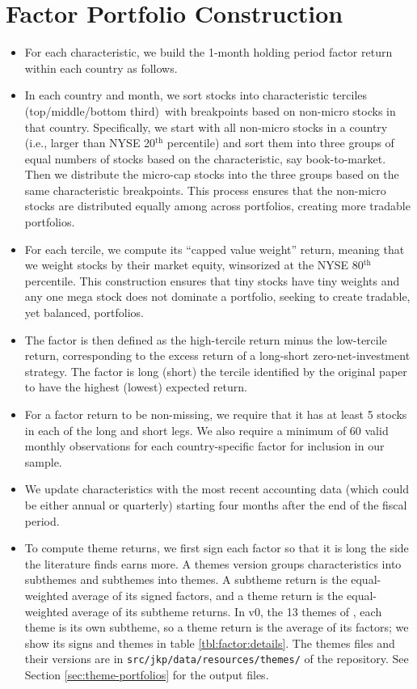 \documentclass[12pt,title,fleqn]{article}
\begin{document}
\section{Factor Portfolio Construction}
\begin{itemize}
	\item For each characteristic, we build the 1-month holding period factor return within each country as follows.  
	\item In each country and month, we sort stocks  into characteristic terciles (top/middle/bottom third)\ with breakpoints based on non-micro stocks in that country.  Specifically, we start with all non-micro stocks in a country (i.e., larger than NYSE  20$^\text{th}$ percentile) and sort them into three groups of equal numbers of stocks based on the characteristic, say book-to-market. Then we distribute the micro-cap stocks into the three groups based on the same characteristic breakpoints. This process ensures that the non-micro stocks are distributed equally among across portfolios, creating more tradable portfolios.  
	\item For each tercile, we compute its ``capped value weight'' return, meaning that we weight stocks by their market equity, winsorized at the NYSE 80$^\text{th}$ percentile. This construction ensures that tiny stocks have tiny weights and any one mega stock does not dominate a portfolio, seeking to create tradable, yet balanced, portfolios.  
	\item The factor is then defined as the high-tercile return minus the low-tercile  return, corresponding to the excess return of a long-short zero-net-investment strategy.  The factor is long (short) the tercile identified by the original paper to have the highest (lowest) expected return.  
	\item For a factor return to be non-missing, we require that it has at least 5 stocks in each of the long and short legs. We also require a minimum of 60 valid monthly observations for each country-specific factor for inclusion in our sample.  
	\item We update characteristics with the most recent accounting data (which could be either annual or quarterly) starting four months after the end of the fiscal period.
	\item To compute theme returns, we first sign each factor so that it is long the side the literature finds earns more. A themes version groups characteristics into subthemes and subthemes into themes. A subtheme return is the equal-weighted average of its signed factors, and a theme return is the equal-weighted average of its subtheme returns. In v0, the 13 themes of \cite{JensenKellyPedersen2023}, each theme is its own subtheme, so a theme return is the average of its factors; we show its signs and themes in table \ref{tbl:factor:details}. The themes files and their versions are in \texttt{src/jkp/data/resources/themes/} of the repository. See Section \ref{sec:theme-portfolios} for the output files.

\end{itemize}
\end{document}
